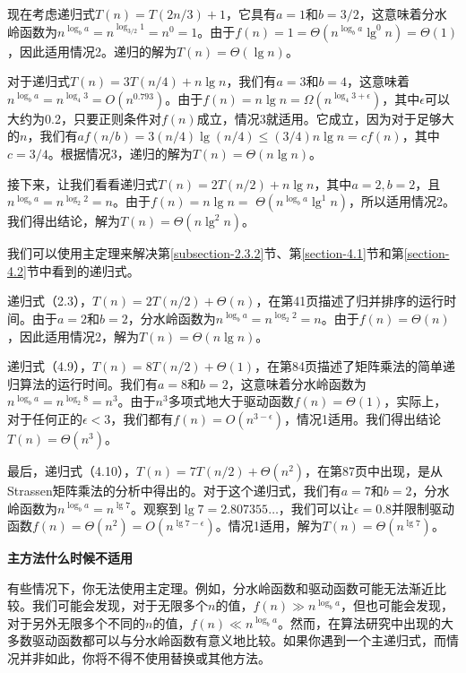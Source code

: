 \documentclass[lang=cn,newtx,10pt,scheme=chinese]{elegantbook}
\begin{document}
现在考虑递归式$T(n)=T(2 n / 3)+1$，它具有$a=1$和$b=3 / 2$，这意味着分水岭函数为$n^{\log _b a}=n^{\log _{3 / 2} 1}=n^0=1$。由于$f(n)=1=\Theta\left(n^{\log _b a} \lg ^0 n\right)=\Theta(1)$，因此适用情况2。递归的解为$T(n)=\Theta(\lg n)$。

对于递归式$T(n)=3 T(n / 4)+n \lg n$，我们有$a=3$和$b=4$，这意味着$n^{\log _b a}=n^{\log _4 3}=O\left(n^{0.793}\right)$。由于$f(n)=n \lg n=\Omega\left(n^{\log _4 3+\epsilon}\right)$，其中$\epsilon$可以大约为0.2，只要正则条件对$f(n)$成立，情况3就适用。它成立，因为对于足够大的$n$，我们有$a f(n / b)=3(n / 4) \lg (n / 4) \leq(3 / 4) n \lg n=c f(n)$，其中$c=3 / 4$。根据情况3，递归的解为$T(n)=\Theta(n \lg n)$。

接下来，让我们看看递归式$T(n)=2 T(n / 2)+n \lg n$，其中$a=2, b=2$，且$n^{\log _b a}=n^{\log _2 2}=n$。由于$f(n)=n \lg n=$ $\Theta\left(n^{\log _b a} \lg ^1 n\right)$，所以适用情况2。我们得出结论，解为$T(n)=\Theta\left(n \lg ^2 n\right)$。

我们可以使用主定理来解决第\ref{subsection-2.3.2}节、第\ref{section-4.1}节和第\ref{section-4.2}节中看到的递归式。

递归式（2.3），$T(n)=2 T(n / 2)+\Theta(n)$，在第41页描述了归并排序的运行时间。由于$a=2$和$b=2$，分水岭函数为$n^{\log _b a}=n^{\log _2 2}=n$。由于$f(n)=\Theta(n)$，因此适用情况2，解为$T(n)=\Theta(n \lg n)$。

递归式（4.9），$T(n)=8 T(n / 2)+\Theta(1)$，在第84页描述了矩阵乘法的简单递归算法的运行时间。我们有$a=8$和$b=2$，这意味着分水岭函数为$n^{\log _b a}=n^{\log _2 8}=n^3$。由于$n^3$多项式地大于驱动函数$f(n)=\Theta(1)$，实际上，对于任何正的$\epsilon<3$，我们都有$f(n)=O\left(n^{3-\epsilon}\right)$，情况1适用。我们得出结论$T(n)=\Theta\left(n^3\right)$。

最后，递归式（4.10），$T(n)=7 T(n / 2)+\Theta\left(n^2\right)$，在第87页中出现，是从Strassen矩阵乘法的分析中得出的。对于这个递归式，我们有$a=7$和$b=2$，分水岭函数为$n^{\log _b a}=n^{\lg 7}$。观察到$\lg 7=2.807355 \ldots$，我们可以让$\epsilon=0.8$并限制驱动函数$f(n)=\Theta\left(n^2\right)=O\left(n^{\lg 7-\epsilon}\right)$。情况1适用，解为$T(n)=\Theta\left(n^{\lg 7}\right)$。

\textbf{主方法什么时候不适用}

有些情况下，你无法使用主定理。例如，分水岭函数和驱动函数可能无法渐近比较。我们可能会发现，对于无限多个$n$的值，$f(n) \gg n^{\log _b a}$，但也可能会发现，对于另外无限多个不同的$n$的值，$f(n) \ll n^{\log _b a}$。然而，在算法研究中出现的大多数驱动函数都可以与分水岭函数有意义地比较。如果你遇到一个主递归式，而情况并非如此，你将不得不使用替换或其他方法。
\end{document}
